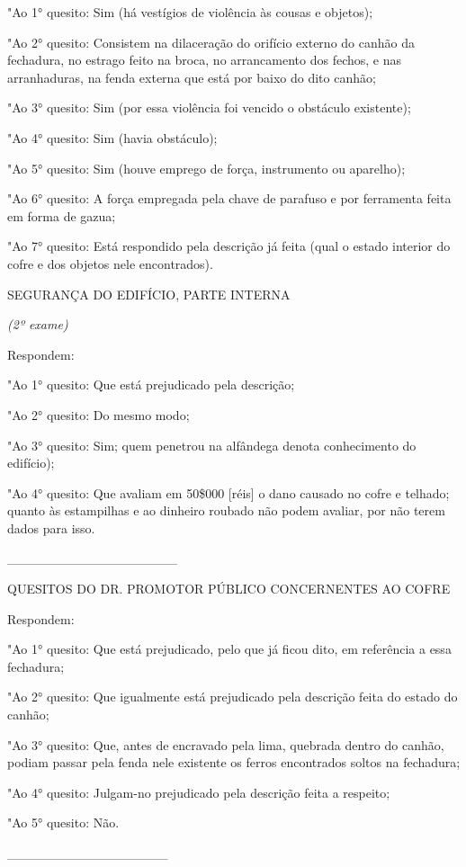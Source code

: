 "Ao 1° quesito: Sim (há vestígios de violência às cousas e objetos);

"Ao 2° quesito: Consistem na dilaceração do orifício externo do canhão
da fechadura, no estrago feito na broca, no arrancamento dos fechos, e
nas arranhaduras, na fenda externa que está por baixo do dito canhão;

"Ao 3° quesito: Sim (por essa violência foi vencido o obstáculo
existente);

"Ao 4° quesito: Sim (havia obstáculo);

"Ao 5° quesito: Sim (houve emprego de força, instrumento ou aparelho);

"Ao 6° quesito: A força empregada pela chave de parafuso e por
ferramenta feita em forma de gazua;

"Ao 7° quesito: Está respondido pela descrição já feita (qual o estado
interior do cofre e dos objetos nele encontrados).

SEGURANÇA DO EDIFÍCIO, PARTE INTERNA

\emph{(2º exame)}

Respondem:

"Ao 1° quesito: Que está prejudicado pela descrição;

"Ao 2° quesito: Do mesmo modo;

"Ao 3° quesito: Sim; quem penetrou na alfândega denota conhecimento do
edifício);

"Ao 4° quesito: Que avaliam em 50\$000 {[}réis{]} o dano causado no
cofre e telhado; quanto às estampilhas e ao dinheiro roubado não podem
avaliar, por não terem dados para isso.

\_\_\_\_\_\_\_\_\_\_\_\_\_\_\_\_\_\_

QUESITOS DO DR. PROMOTOR PÚBLICO CONCERNENTES AO COFRE

Respondem:

"Ao 1° quesito: Que está prejudicado, pelo que já ficou dito, em
referência a essa fechadura;

"Ao 2° quesito: Que igualmente está prejudicado pela descrição feita do
estado do canhão;

"Ao 3° quesito: Que, antes de encravado pela lima, quebrada dentro do
canhão, podiam passar pela fenda nele existente os ferros encontrados
soltos na fechadura;

"Ao 4° quesito: Julgam-no prejudicado pela descrição feita a respeito;

"Ao 5° quesito: Não.

\_\_\_\_\_\_\_\_\_\_\_\_\_\_\_\_\_

